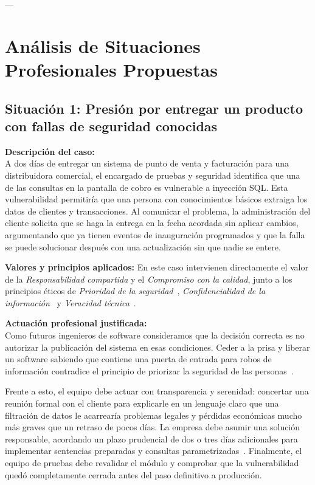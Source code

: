 \documentclass[12pt,a4paper,oneside]{article}
\begin{document}
---

\section{Análisis de Situaciones Profesionales Propuestas}

\subsection{Situación 1: Presión por entregar un producto con fallas de seguridad conocidas}

\textbf{Descripción del caso:}\\
A dos días de entregar un sistema de punto de venta y facturación para una distribuidora comercial, el encargado de pruebas y seguridad identifica que una de las consultas en la pantalla de cobro es vulnerable a inyección SQL. Esta vulnerabilidad permitiría que una persona con conocimientos básicos extraiga los datos de clientes y transacciones. Al comunicar el problema, la administración del cliente solicita que se haga la entrega en la fecha acordada sin aplicar cambios, argumentando que ya tienen eventos de inauguración programados y que la falla se puede solucionar después con una actualización sin que nadie se entere.

\textbf{Valores y principios aplicados:}
En este caso intervienen directamente el valor de la \textit{Responsabilidad compartida} y el \textit{Compromiso con la calidad}, junto a los principios éticos de \textit{Prioridad de la seguridad}~\cite{acm2018,ieee2020}, \textit{Confidencialidad de la información}~\cite{gotterbarn2001} y \textit{Veracidad técnica}~\cite{sommerville2011}.

\textbf{Actuación profesional justificada:}\\
Como futuros ingenieros de software consideramos que la decisión correcta es no autorizar la publicación del sistema en esas condiciones. Ceder a la prisa y liberar un software sabiendo que contiene una puerta de entrada para robos de información contradice el principio de priorizar la seguridad de las personas~\cite{acm2018,ieee2020}.

Frente a esto, el equipo debe actuar con transparencia y serenidad: concertar una reunión formal con el cliente para explicarle en un lenguaje claro que una filtración de datos le acarrearía problemas legales y pérdidas económicas mucho más graves que un retraso de pocos días. La empresa debe asumir una solución responsable, acordando un plazo prudencial de dos o tres días adicionales para implementar sentencias preparadas y consultas parametrizadas~\cite{sommerville2011}. Finalmente, el equipo de pruebas debe revalidar el módulo y comprobar que la vulnerabilidad quedó completamente cerrada antes del paso definitivo a producción.
\end{document}
